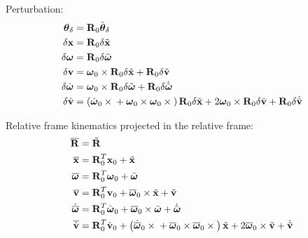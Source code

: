 \documentclass[10pt,dvips,fleqn,subeqn]{report}
\newcommand{\T}[1]{\bm{\mathbf{#1}}}
\newcommand{\TT}[1]{\bm{\mathbf{#1}}}
\begin{document}
Perturbation:
\begin{subequations}
\begin{align}
	\T{\theta}_{\delta} &= \TT{R}_0 \tilde{\T{\theta}}_{\delta} \\
	\delta\T{x} &= \TT{R}_0 \delta\tilde{\T{x}} \\
	\delta\T{\omega} &= \TT{R}_0 \delta\tilde{\T{\omega}} \\
	\delta\T{v} &= \T{\omega}_0 \times \TT{R}_0 \delta\tilde{\T{x}}
		+ \TT{R}_0 \delta\tilde{\T{v}} \\
	\delta\dot{\T{\omega}} &= \T{\omega}_0 \times \TT{R}_0 \delta\tilde{\T{\omega}} 
		+ \TT{R}_0 \delta\dot{\tilde{\T{\omega}}} \\
	\delta\dot{\T{v}} &= \plbr{
			\dot{\T{\omega}}_0 \times{}
			+ \T{\omega}_0 \times \T{\omega}_0 \times{}
		} \TT{R}_0 \delta\tilde{\T{x}}
		+ 2 \T{\omega}_0 \times \TT{R}_0 \delta\tilde{\T{v}}
		+ \TT{R}_0 \delta\dot{\tilde{\T{v}}}
\end{align}
\end{subequations}

Relative frame kinematics projected in the relative frame:
\begin{subequations}
\begin{align}
	\overline{\TT{R}} &= \tilde{\TT{R}} \\
	\overline{\T{x}} &= \TT{R}_0^T \T{x}_0
		+ \tilde{\T{x}} \\
	\overline{\T{\omega}} &= \TT{R}_0^T \T{\omega}_0
		+ \tilde{\T{\omega}} \\
	\overline{\T{v}} &= \TT{R}_0^T \T{v}_0
		+ \overline{\T{\omega}}_0 \times \tilde{\T{x}}
		+ \tilde{\T{v}} \\
	\dot{\overline{\T{\omega}}} &= \TT{R}_0^T \dot{\T{\omega}}_0
		+ \overline{\T{\omega}}_0 \times \tilde{\T{\omega}} 
		+ \dot{\tilde{\T{\omega}}} \\
	\overline{\dot{\T{v}}} &= \TT{R}_0^T \dot{\T{v}}_0
		+ \plbr{
			\dot{\overline{\T{\omega}}}_0 \times{}
			+ \overline{\T{\omega}}_0 \times \overline{\T{\omega}}_0 \times{}
		} \tilde{\T{x}}
		+ 2 \overline{\T{\omega}}_0 \times \tilde{\T{v}}
		+ \dot{\tilde{\T{v}}}
\end{align}
\end{subequations}
\end{document}
